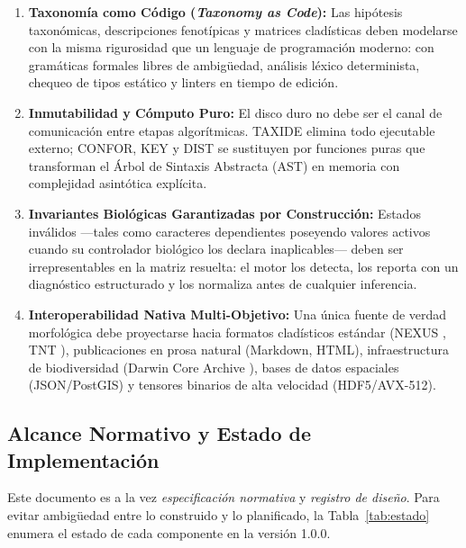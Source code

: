 \documentclass[11pt,a4paper]{article}
\newcommand{\taxideversion}{1.0.0}
\theoremstyle{definition}
\theoremstyle{remark}
\begin{document}
\begin{enumerate}
    \item \textbf{Taxonomía como Código (\textit{Taxonomy as Code}):} Las hipótesis taxonómicas, descripciones fenotípicas y matrices cladísticas deben modelarse con la misma rigurosidad que un lenguaje de programación moderno: con gramáticas formales libres de ambigüedad, análisis léxico determinista, chequeo de tipos estático y linters en tiempo de edición.
    \item \textbf{Inmutabilidad y Cómputo Puro:} El disco duro no debe ser el canal de comunicación entre etapas algorítmicas. TAXIDE elimina todo ejecutable externo; CONFOR, KEY y DIST se sustituyen por funciones puras que transforman el Árbol de Sintaxis Abstracta (AST) en memoria con complejidad asintótica explícita.
    \item \textbf{Invariantes Biológicas Garantizadas por Construcción:} Estados inválidos ---tales como caracteres dependientes poseyendo valores activos cuando su controlador biológico los declara inaplicables--- deben ser irrepresentables en la matriz resuelta: el motor los detecta, los reporta con un diagnóstico estructurado y los normaliza antes de cualquier inferencia.
    \item \textbf{Interoperabilidad Nativa Multi-Objetivo:} Una única fuente de verdad morfológica debe proyectarse hacia formatos cladísticos estándar (NEXUS \cite{maddison1997}, TNT \cite{goloboff2008}), publicaciones en prosa natural (Markdown, HTML), infraestructura de biodiversidad (Darwin Core Archive \cite{wieczorek2012}), bases de datos espaciales (JSON/PostGIS) y tensores binarios de alta velocidad (HDF5/AVX-512).
\end{enumerate}

\subsection{Alcance Normativo y Estado de Implementación}
Este documento es a la vez \emph{especificación normativa} y \emph{registro de diseño}. Para evitar ambigüedad entre lo construido y lo planificado, la Tabla~\ref{tab:estado} enumera el estado de cada componente en la versión \taxideversion.
\end{document}
